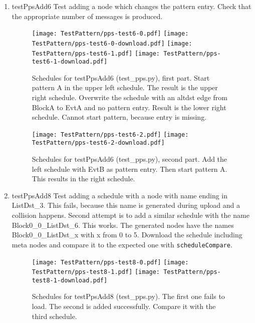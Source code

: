 \documentclass[12pt,a4paper]{report}
\begin{document}
\begin{enumerate}
\item testPpsAdd6
    Test adding a node which changes the pattern entry.
    Check that the appropriate number of messages is produced.
    \begin{figure}
        \centering
        \texttt{[image: TestPattern/pps-test6-0.pdf]}
        \texttt{[image: TestPattern/pps-test6-0-download.pdf]}
        \texttt{[image: TestPattern/pps-test6-1.pdf]}
        \texttt{[image: TestPattern/pps-test6-1-download.pdf]}
        \caption{Schedules for testPpsAdd6 (test\_pps.py), first part. Start pattern A in the upper left schedule.
        The result is the upper right schedule. Overwrite the schedule with an altdst edge from
        BlockA to EvtA and no pattern entry. Result is the lower right schedule.
        Cannot start pattern, because entry is missing.}
        \label{fig:Schedules_for_testPpsAdd6-0}
    \end{figure}
    \begin{figure}
        \centering
        \texttt{[image: TestPattern/pps-test6-2.pdf]}
        \texttt{[image: TestPattern/pps-test6-2-download.pdf]}
        \caption{Schedules for testPpsAdd6 (test\_pps.py), second part.
        Add the left schedule with EvtB as pattern entry. Then start pattern A. This results in the right schedule.}
        \label{fig:Schedules_for_testPpsAdd6-1}
    \end{figure}

\item testPpsAdd8
    Test adding a schedule with a node with name ending in ListDst\_3. This fails,
    because this name is generated during upload and a collision happens.
    Second attempt is to add a similar schedule with the name Block0\_0\_ListDst\_6.
    This works. The generated nodes have the names Block0\_0\_ListDst\_x with x from 0 to 5.
    Download the schedule including meta nodes and compare it to the expected one with \texttt{scheduleCompare}.
    \begin{figure}
        \centering
        \texttt{[image: TestPattern/pps-test8-0.pdf]}
        \texttt{[image: TestPattern/pps-test8-1.pdf]}
        \texttt{[image: TestPattern/pps-test8-1-download.pdf]}
        \caption{Schedules for testPpsAdd8 (test\_pps.py). The first one fails to load. The second
        is added successfully. Compare it with the third schedule.}
        \label{fig:Schedules_for_testPpsAdd8-0}
    \end{figure}

\end{enumerate}
\end{document}
